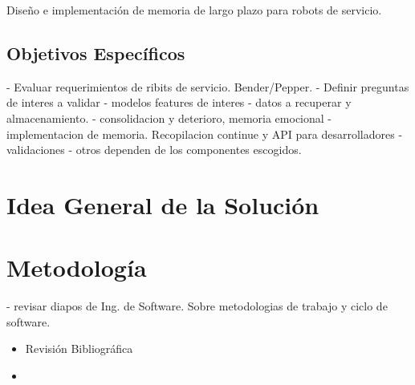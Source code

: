 \documentclass[12pt,letterpaper,spanish]{article}
\begin{document}
Dise\~no e implementaci\'on de memoria de largo plazo para robots de servicio.

\subsection{Objetivos Espec\'ificos}


- Evaluar requerimientos de ribits de servicio. Bender/Pepper.
- Definir preguntas de interes a validar
- modelos features de interes
- datos a recuperar y almacenamiento.
- consolidacion y deterioro, memoria emocional
- implementacion de memoria. Recopilacion continue y API para desarrolladores
- validaciones
- otros dependen de los componentes escogidos.


\section{Idea General de la Soluci\'on}



\section{Metodolog\'ia}


- revisar diapos de Ing. de Software. Sobre metodologias de trabajo y ciclo de software.


\begin{itemize}
\item Revisi\'on Bibliogr\'afica
\item 
\end{itemize}




\end{document}
